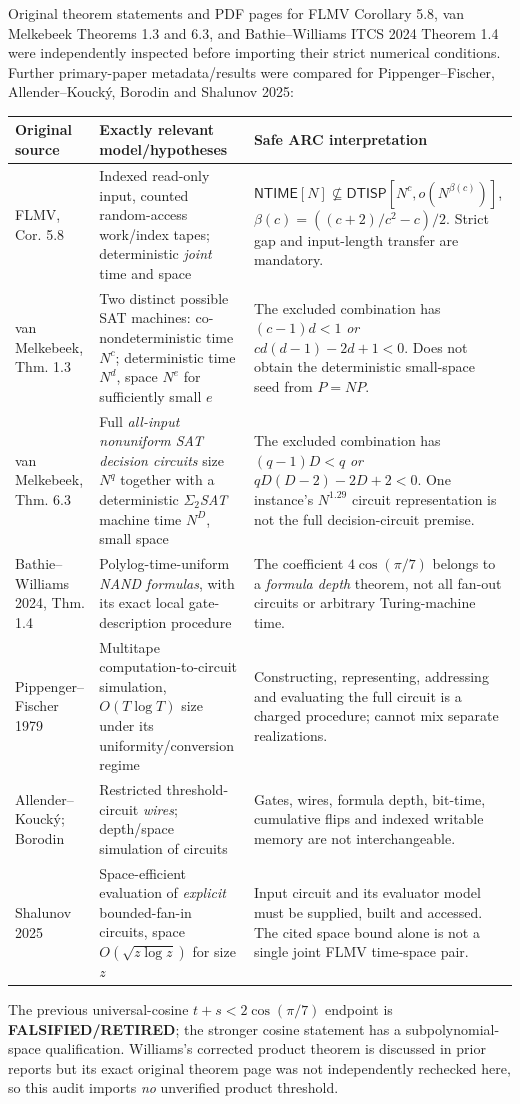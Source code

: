 \documentclass[11pt]{article}
\newcommand{\NTIME}{\mathsf{NTIME}}
\newcommand{\DTISP}{\mathsf{DTISP}}
\begin{document}
Original theorem statements and PDF pages for FLMV Corollary 5.8, van Melkebeek Theorems 1.3 and 6.3, and Bathie--Williams ITCS 2024 Theorem 1.4 were independently inspected before importing their strict numerical conditions. Further primary-paper metadata/results were compared for Pippenger--Fischer, Allender--Kouck\'y, Borodin and Shalunov 2025:
\begin{center}\small
\begin{tabularx}{\linewidth}{@{}p{.21\linewidth}p{.35\linewidth}X@{}}
\toprule
Original source & Exactly relevant model/hypotheses & Safe ARC interpretation\\
\midrule
FLMV, Cor. 5.8 & Indexed read-only input, counted random-access work/index tapes; deterministic \emph{joint} time and space & $\NTIME[N]\not\subseteq\DTISP[N^c,o(N^{\beta(c)})]$, $\beta(c)=((c+2)/c^2-c)/2$. Strict gap and input-length transfer are mandatory.\\
van Melkebeek, Thm. 1.3 & Two distinct possible SAT machines: co-nondeterministic time $N^c$; deterministic time $N^d$, space $N^e$ for sufficiently small $e$ & The excluded combination has $(c-1)d<1$ \emph{or} $cd(d-1)-2d+1<0$. Does not obtain the deterministic small-space seed from $P=NP$.\\
van Melkebeek, Thm. 6.3 & Full \emph{all-input nonuniform SAT decision circuits} size $N^q$ together with a deterministic \emph{$\Sigma_2$SAT} machine time $N^D$, small space & The excluded combination has $(q-1)D<q$ \emph{or} $qD(D-2)-2D+2<0$. One instance's $N^{1.29}$ circuit representation is not the full decision-circuit premise.\\
Bathie--Williams 2024, Thm. 1.4 & Polylog-time-uniform \emph{NAND formulas}, with its exact local gate-description procedure & The coefficient $4\cos(\pi/7)$ belongs to a \emph{formula depth} theorem, not all fan-out circuits or arbitrary Turing-machine time.\\
Pippenger--Fischer 1979 & Multitape computation-to-circuit simulation, $O(T\log T)$ size under its uniformity/conversion regime & Constructing, representing, addressing and evaluating the full circuit is a charged procedure; cannot mix separate realizations.\\
Allender--Kouck\'y; Borodin & Restricted threshold-circuit \emph{wires}; depth/space simulation of circuits & Gates, wires, formula depth, bit-time, cumulative flips and indexed writable memory are not interchangeable.\\
Shalunov 2025 & Space-efficient evaluation of \emph{explicit} bounded-fan-in circuits, space $O(\sqrt{z\log z})$ for size $z$ & Input circuit and its evaluator model must be supplied, built and accessed. The cited space bound alone is not a single joint FLMV time-space pair.\\
\bottomrule
\end{tabularx}
\end{center}
The previous universal-cosine $t+s<2\cos(\pi/7)$ endpoint is \textbf{FALSIFIED/RETIRED}; the stronger cosine statement has a subpolynomial-space qualification. Williams's corrected product theorem is discussed in prior reports but its exact original theorem page was not independently rechecked here, so this audit imports \emph{no} unverified product threshold.
\end{document}
